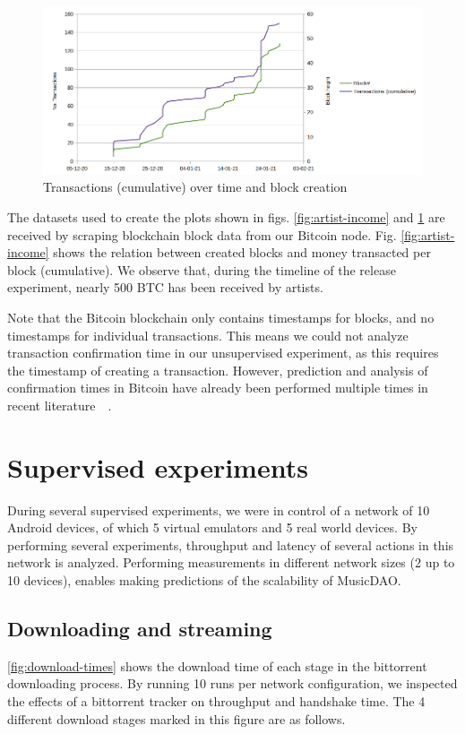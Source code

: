 \begin{figure}
    \centering
    \includegraphics[width=1\textwidth]{evaluation/transactions.png}
    \caption{Transactions (cumulative) over time and block creation}
    \label{fig:transactions}
\end{figure}

The datasets used to create the plots shown in figs. \ref{fig:artist-income} and \ref{fig:transactions} are received by scraping blockchain block data from our Bitcoin node. Fig. \ref{fig:artist-income} shows the relation between created blocks and money transacted per block (cumulative). We observe that, during the timeline of the release experiment, nearly 500 BTC has been received by artists.

Note that the Bitcoin blockchain only contains timestamps for blocks, and no timestamps for individual transactions. This means we could not analyze transaction confirmation time in our unsupervised experiment, as this requires the timestamp of creating a transaction. However, prediction and analysis of confirmation times in Bitcoin have already been performed multiple times in recent literature~\citep{kawase2017transaction}~\citep{koops2018predicting}.

\section{Supervised experiments}
During several supervised experiments, we were in control of a network of 10 Android devices, of which 5 virtual emulators and 5 real world devices. By performing several experiments, throughput and latency of several actions in this network is analyzed. Performing measurements in different network sizes (2 up to 10 devices), enables making predictions of the scalability of MusicDAO.

\subsection{Downloading and streaming}
\ref{fig:download-times} shows the download time of each stage in the bittorrent downloading process. By running 10 runs per network configuration, we inspected the effects of a bittorrent tracker on throughput and handshake time. The 4 different download stages marked in this figure are as follows.

